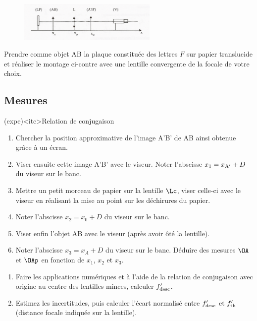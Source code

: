 \documentclass[../main/main.tex]{subfiles}
\begin{document}
\begin{figure}
	\vspace*{-40pt}
	\begin{center}
		\includegraphics[width=0.6\textwidth]{pointeLongitudinal}
	\end{center}
\end{figure}

Prendre comme objet AB la plaque constituée des lettres $F$ sur papier
translucide et réaliser le montage ci-contre avec une lentille convergente de la
focale de votre choix.

\subsection{Mesures}

\begin{tcb}[breakable](expe)<itc>{Relation de conjugaison}
	\begin{enumerate}
		\item Chercher la position approximative de l'image A'B' de AB ainsi obtenue
		      grâce à un écran.
		\item Viser ensuite cette image A'B' avec le viseur. Noter l'abscisse $x_1 =
			      x_{\rm A'} + D$ du viseur sur le banc.
		\item Mettre un petit morceau de papier sur la lentille $\Lc$, viser celle-ci
		      avec le viseur en réalisant la mise au point sur les déchirures du
		      papier.
		\item Noter l'abscisse $x_2 = x_0 + D$ du viseur sur le banc.
		\item Viser enfin l'objet AB avec le viseur (après avoir ôté la lentille).
		\item Noter l'abscisse $x_3 = x_{A} + D$ du viseur sur le banc. Déduire des
		      mesures $\OA$ et $\OAp$ en fonction de $x_1$, $x_2$ et $x_3$.
	\end{enumerate}
\end{tcb}

\begin{enumerate}[label=\sqenumi, start=5]
	\item Faire les applications numériques et à l'aide de la relation de
	      conjugaison avec origine au centre des lentilles minces, calculer
	      $f_{\rm desc}'$.
	\item Estimez les incertitudes, puis calculer
	      l'écart normalisé entre $f_{\rm desc}'$ et $f_{\rm th}'$ (distance
	      focale indiquée sur la lentille).
\end{enumerate}
\end{document}
